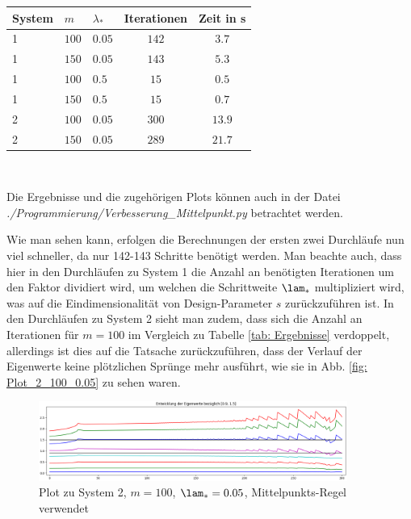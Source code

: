 \documentclass[a4paper,12pt]{report}
\newcommand{\1}{\mathds{1}}
\theoremstyle{plain} %
\theoremstyle{definition} %
\theoremstyle{remark}
\begin{document}
            \begin{table}[!ht]
                  \centering
                  \begin{tabular}{lllcc}
                       System & $m$ & $\lambda_*$ & Iterationen & Zeit in s\\
                       \hline
                       1 & $100$ & $0.05$ & $142$ & $3.7$ \\ 
                       1 & $150$ & $0.05$ & $143$ & $5.3$ \\
                       \hline
                       1 & $100$ & $0.5$ & $15$ & $0.5$ \\
                       1 & $150$ & $0.5$ & $15$ & $0.7$ \\
                       \hline
                       2 & $100$ & $0.05$ & $300$ & $13.9$ \\
                       2 & $150$ & $0.05$ & $289$ & $21.7$ \\
                       \hline
                  \end{tabular}\\
                  \label{tab: Ergebnisse_Mittelpunkt}
            \end{table}

            Die Ergebnisse und die zugehörigen Plots können auch in der Datei \textit{./Programmierung/Verbesserung\_Mittelpunkt.py} betrachtet werden.

            Wie man sehen kann, erfolgen die Berechnungen der ersten zwei Durchläufe nun viel schneller, da nur 142-143 Schritte benötigt werden.
            Man beachte auch, dass hier in den Durchläufen zu System 1 die Anzahl an benötigten Iterationen um den Faktor dividiert wird, um welchen die Schrittweite $\lam_*$ multipliziert wird, was auf die Eindimensionalität von Design-Parameter $s$ zurückzuführen ist.
            In den Durchläufen zu System 2 sieht man zudem, dass sich die Anzahl an Iterationen für $m=100$ im Vergleich zu Tabelle \ref{tab: Ergebnisse} verdoppelt, allerdings ist dies auf die Tatsache zurückzuführen, dass der Verlauf der Eigenwerte keine plötzlichen Sprünge mehr ausführt, wie sie in Abb. \ref{fig: Plot_2_100_0.05} zu sehen waren.

            \begin{figure}[ht]
                  \centering
                  \includegraphics[width=0.9\textwidth, keepaspectratio]{./Verbesserung_Mittelpunkt/Plot_2_100_0.05.png}
                  \caption{Plot zu System 2, $m=100$, $\lam_*=0.05$, Mittelpunkts-Regel verwendet}
                  \label{fig: Plot_2_Mittelpunkt}
            \end{figure}
\end{document}
